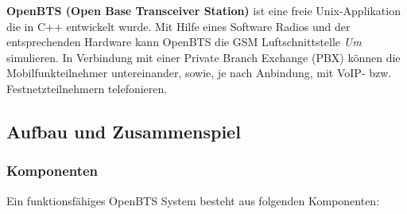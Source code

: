 \newpage
{}\label{sec:openbts}
\textbf{OpenBTS (Open Base Transceiver Station)} ist eine freie Unix-Applikation die in C++ entwickelt wurde. Mit Hilfe eines Software Radios und der entsprechenden Hardware kann OpenBTS die GSM Luftschnittstelle \textit{Um} simulieren. In Verbindung mit einer Private Branch Exchange (PBX) können die Mobilfunkteilnehmer untereinander, sowie, je nach Anbindung, mit VoIP- bzw. Festnetzteilnehmern telefonieren.

\subsection{Aufbau und Zusammenspiel}
\subsubsection{Komponenten}
Ein funktionsfähiges OpenBTS System besteht aus folgenden Komponenten:

